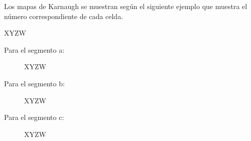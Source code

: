 
  Los mapas de Karnaugh se muestran según el siguiente ejemplo que muestra el
  número correspondiente de cada celda.
  \begin{center}
    \begin{Karnaugh}{X}{Y}{Z}{W}
    \end{Karnaugh}
  \end{center}

  Para el segmento a:
  \begin{figure}[H]
    \begin{center}
      \begin{Karnaugh}{X}{Y}{Z}{W}
      \end{Karnaugh}
    \end{center}
  \end{figure}

  Para el segmento b:
  \begin{figure}[H]
    \begin{center}
      \begin{Karnaugh}{X}{Y}{Z}{W}
      \end{Karnaugh}
    \end{center}
  \end{figure}

  Para el segmento c:
  \begin{figure}[H]
    \begin{center}
      \begin{Karnaugh}{X}{Y}{Z}{W}
      \end{Karnaugh}
    \end{center}
  \end{figure}

